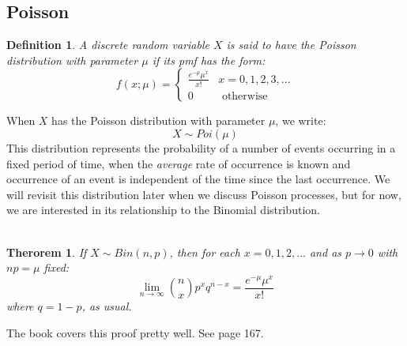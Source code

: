 \documentclass[12pt]{article} %
\newtheorem{defn}{Definition}
\newtheorem{thm}{Therorem}
\begin{document}
\subsection{Poisson}
\begin{defn}
A discrete random variable $X$ is said to have the \emph{Poisson distribution} with parameter $\mu$ if its pmf has the form:
$$f(x;\mu) = \left\{\begin{matrix}
\frac{e^{-\mu}\mu^x}{x!} & x=0,1,2,3,...\\0&\textrm{ otherwise}
\end{matrix}\right.$$
\end{defn}
When $X$ has the Poisson distribution with parameter $\mu$, we write:
$$X\sim Poi(\mu)$$
This distribution represents the probability of a number of events occurring in a fixed period of time, when the \emph{average} rate of occurrence is known and occurrence of an event is independent of the time since the last occurrence. We will revisit this distribution later when we discuss Poisson processes, but for now, we are interested in its relationship to the Binomial distribution.\\\\
\begin{thm}
If $X\sim Bin(n,p)$, then for each $x=0,1,2,...$ and as $p\rightarrow 0$ with $np=\mu$ fixed:
$$\lim_{n\rightarrow\infty} {n\choose{x}}p^xq^{n-x} = \frac{e^{-\mu}\mu^x}{x!}$$
where $q=1-p$, as usual.
\end{thm}
The book covers this proof pretty well. See page 167.
\end{document}
